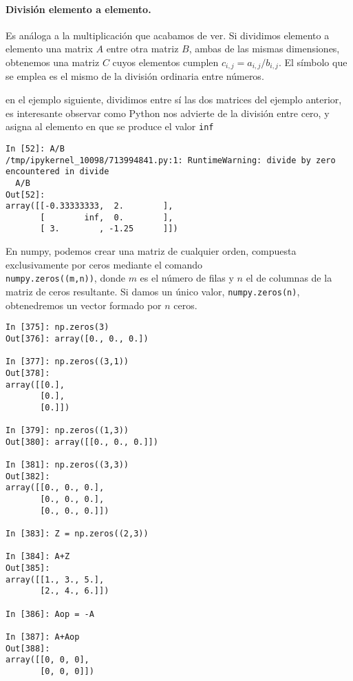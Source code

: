 \begin{paracol}{2}
\paragraph{División elemento a elemento.} Es análoga a la multiplicación que acabamos de ver. Si dividimos elemento a elemento una matrix $A$ entre otra matriz $B$, ambas de las mismas dimensiones, obtenemos una matriz $C$ cuyos elementos cumplen $c_{i,j} = a_{i,j}/b_{i,j}$. El símbolo que se emplea es el mismo de la división ordinaria entre números.

en el ejemplo siguiente, dividimos entre sí las dos matrices del ejemplo anterior, es interesante observar como Python nos advierte de la división entre cero, y asigna al elemento en que se produce el valor \texttt{inf}
\end{paracol}
\begin{center}
    \begin{minipage}{\textwidth}
        \begin{verbatim}
In [52]: A/B
/tmp/ipykernel_10098/713994841.py:1: RuntimeWarning: divide by zero encountered in divide
  A/B
Out[52]: 
array([[-0.33333333,  2.        ],
       [        inf,  0.        ],
       [ 3.        , -1.25      ]])
\end{verbatim}
\end{minipage}
\end{center}
\begin{paracol}{2}
En numpy, podemos crear una matriz de cualquier orden, compuesta exclusivamente por ceros mediante el comando\\ \texttt{numpy.zeros((m,n))}, donde $m$ es el número de filas y $n$ el de columnas de la matriz de ceros resultante. Si damos un único valor, \texttt{numpy.zeros(n)}, obtenedremos un vector formado por $n$ ceros.
\end{paracol}
\begin{center}
    \begin{minipage}{.3\textwidth}
        \begin{verbatim}
In [375]: np.zeros(3)
Out[376]: array([0., 0., 0.])

In [377]: np.zeros((3,1))
Out[378]: 
array([[0.],
       [0.],
       [0.]])

In [379]: np.zeros((1,3))
Out[380]: array([[0., 0., 0.]])

In [381]: np.zeros((3,3))
Out[382]: 
array([[0., 0., 0.],
       [0., 0., 0.],
       [0., 0., 0.]])
       
In [383]: Z = np.zeros((2,3))

In [384]: A+Z
Out[385]: 
array([[1., 3., 5.],
       [2., 4., 6.]])

In [386]: Aop = -A

In [387]: A+Aop
Out[388]: 
array([[0, 0, 0],
       [0, 0, 0]])
        \end{verbatim}
    \end{minipage}
\end{center}

